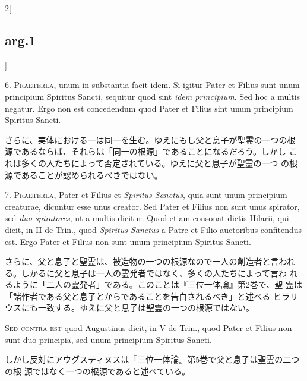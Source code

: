 \documentclass[paper=a4paper,fontsize=10pt,jafontsize=9pt,titlepage]{jlreq}
\begin{document}
\begin{paracol}{2}[\subsection{arg.1}]

6. {\scshape Praeterea}, unum in substantia facit idem. Si igitur Pater et Filius
sunt unum principium  Spiritus Sancti, sequitur quod sint {\itshape idem
principium}. Sed hoc a multis negatur. Ergo non est concedendum quod
Pater et Filius sint unum principium  Spiritus Sancti.

\switchcolumn

さらに、実体における一は同一を生む。ゆえにもし父と息子が聖霊の一つの根
 源であるならば、それらは「同一の根源」であることになるだろう。しかし
 これは多くの人たちによって否定されている。ゆえに父と息子が聖霊の一つ
 の根源であることが認められるべきではない。


7. {\scshape Praeterea}, Pater et Filius et {\itshape  Spiritus Sanctus}, quia sunt
unum principium creaturae, dicuntur esse unus creator. Sed Pater et
Filius non sunt unus spirator, sed {\itshape duo spiratores}, ut a multis
dicitur. Quod etiam consonat dictis Hilarii, qui dicit, in II de
Trin., quod {\itshape  Spiritus Sanctus} a Patre et Filio auctoribus
confitendus est. Ergo Pater et Filius non sunt unum principium
Spiritus Sancti.

\switchcolumn

さらに、父と息子と聖霊は、被造物の一つの根源なので一人の創造者と言われ
 る。しかるに父と息子は一人の霊発者ではなく、多くの人たちによって言わ
 れるように「二人の霊発者」である。このことは『三位一体論』第2巻で、聖
 霊は「諸作者である父と息子とからであることを告白されるべき」と述べる
 ヒラリウスにも一致する。ゆえに父と息子は聖霊の一つの根源ではない。

\switchcolumn*[\subsection{s.c.}]

{\scshape Sed contra est} quod Augustinus dicit, in V de Trin., quod Pater et
Filius non sunt duo principia, sed unum principium  Spiritus Sancti.

\switchcolumn

しかし反対にアウグスティヌスは『三位一体論』第5巻で父と息子は聖霊の二つの根
 源ではなく一つの根源であると述べている。


\end{paracol}
\end{document}
